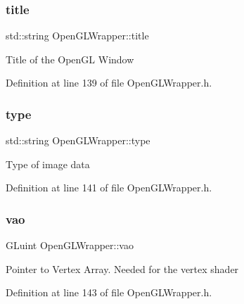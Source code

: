 \mbox{\label{classOpenGLWrapper_a558d0311b7f0e3ebc543a20a0c874bcc}} 
\subsubsection{\texorpdfstring{title}{title}}
{\footnotesize\ttfamily std\+::string Open\+G\+L\+Wrapper\+::title\hspace{0.3cm}{\ttfamily [private]}}

Title of the Open\+GL Window 

Definition at line 139 of file Open\+G\+L\+Wrapper.\+h.

\mbox{\label{classOpenGLWrapper_a57e78029e7ee9951ea961b414b0e64e4}} 
\subsubsection{\texorpdfstring{type}{type}}
{\footnotesize\ttfamily std\+::string Open\+G\+L\+Wrapper\+::type\hspace{0.3cm}{\ttfamily [private]}}

Type of image data 

Definition at line 141 of file Open\+G\+L\+Wrapper.\+h.

\mbox{\label{classOpenGLWrapper_a87d3090b9ef2e52b7b7d0bbf8df184ab}} 
\subsubsection{\texorpdfstring{vao}{vao}}
{\footnotesize\ttfamily G\+Luint Open\+G\+L\+Wrapper\+::vao\hspace{0.3cm}{\ttfamily [private]}}

Pointer to Vertex Array. Needed for the vertex shader 

Definition at line 143 of file Open\+G\+L\+Wrapper.\+h.

\mbox{\label{classOpenGLWrapper_a3585a72247c149b07d7fb56f5a464646}} 
